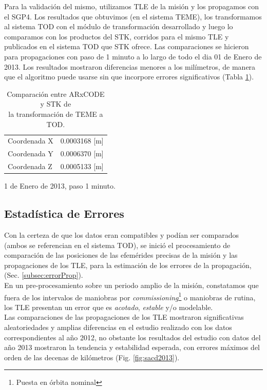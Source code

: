 Para la validaci\'on del mismo, utilizamos TLE de la misi\'on y los propagamos con el SGP4. Los resultados que obtuvimos (en el sistema TEME), los transformamos al sistema TOD con el m\'odulo de transformaci\'on desarrollado y luego lo comparamos con los productos del STK, corridos para el mismo TLE y publicados en el sistema TOD que STK ofrece. Las comparaciones se hicieron para propagaciones con paso de 1 minuto a lo largo de todo el dia 01 de Enero de 2013. Los resultados mostraron diferencias menores a los mil\'imetros, de manera que el algoritmo puede usarse sin que incorpore errores significativos  (Tabla \ref{tab:compprecisas}).\\

\begin{table}[!h]
\caption{Comparaci\'on entre ARxCODE y STK de \\la transformaci\'on de TEME a TOD.}
\begin{tabular}{l|c}
  \hline
  Coordenada  X &  0.0003168 [m]\\
  Coordenada Y &  0.0006370 [m]\\
  Coordenada Z &  0.0005133 [m]\\
  \hline
\end{tabular}
\label{tab:compprecisas}
\begin{flushleft}
\small 1 de Enero de 2013, paso 1 minuto.
\end{flushleft}

\end{table}

\subsection*{Estad\'istica de Errores}
Con la certeza de que los datos eran compatibles y pod\'ian ser comparados (ambos se referencian en el sistema TOD), se inici\'o el procesamiento de comparaci\'on de las posiciones de las efem\'erides precisas de la misi\'on y las propagaciones de los TLE, para la estimaci\'on de los errores de la propagaci\'on, (Sec. \ref{subsec:errorProp}).\\

En un pre-procesamiento sobre un periodo amplio de la misi\'on, constatamos que fuera de los intervalos de maniobras por {\it{commissioning}}\footnote{Puesta en \'orbita nominal} o maniobras de rutina, los TLE presentan un error que es {\it{acotado}}, {\it{estable}} y/o modelable. \\

Las comparaciones de las propagaciones de los TLE mostraron significativas aleatoriedades y amplias diferencias en el estudio realizado con los datos correspondientes al a\~no 2012, no obstante los resultados del estudio con datos del a\~no 2013 mostraron la tendencia y estabilidad esperada, con errores m\'aximos del orden de las decenas de kil\'ometros (Fig. \ref{fig:sacd2013}).


